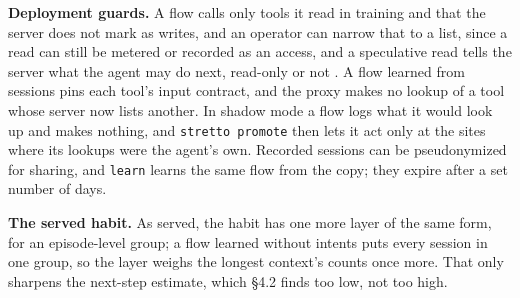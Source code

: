 \documentclass[10pt,twocolumn,letterpaper]{article}
\newcommand{\runin}[1]{{\sffamily\bfseries\color{accent}#1}}
\begin{document}
\runin{Deployment guards.} A flow calls only tools it read in training and that the server does not mark as writes, and an operator can narrow that to a list, since a read can still be metered or recorded as an access, and a speculative read tells the server what the agent may do next, read-only or not \citep{mohammadi2026ghost}. A flow learned from sessions pins each tool's input contract, and the proxy makes no lookup of a tool whose server now lists another. In shadow mode a flow logs what it would look up and makes nothing, and \texttt{stretto\ promote} then lets it act only at the sites where its lookups were the agent's own. Recorded sessions can be pseudonymized for sharing, and \texttt{learn} learns the same flow from the copy; they expire after a set number of days.

\runin{The served habit.} As served, the habit has one more layer of the same form, for an episode-level group; a flow learned without intents puts every session in one group, so the layer weighs the longest context's counts once more. That only sharpens the next-step estimate, which §4.2 finds too low, not too high.
\end{document}
